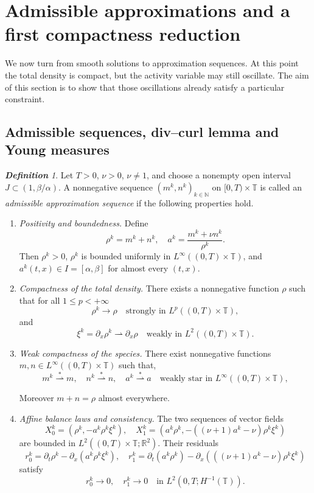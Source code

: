 \documentclass[a4paper,twosided,11pt]{article}
\newcommand{\R}{\mathbb{R}}
\newcommand{\N}{\mathbb{N}}
\newcommand{\T}{\mathbb{T}}
\newcommand{\al}{\alpha}
\newcommand{\be}{\beta}
\newcommand{\p}{\partial}
\newcommand{\1}{\mathbf{1}}
\theoremstyle{plain}
\theoremstyle{remark}
\newtheorem{definition}[thm]{\bf Definition}
\newcommand{\weakto}{\rightharpoonup}
\numberwithin{equation}{section}
\begin{document}
\section{Admissible approximations and a first compactness reduction}
\label{sec:young}

We now turn from smooth solutions to approximation sequences. At this point the total density is compact, but the activity variable may still oscillate. The aim of this section is to show that those oscillations already satisfy a particular constraint.

\subsection{Admissible sequences, div--curl lemma and Young measures}

\begin{definition}
\label{def:admissible}
Let $T>0$, $\nu>0$, $\nu\neq 1$, and choose a nonempty open interval $J\subset(1,\be/\al)$. A nonnegative sequence $(m^k,n^k)_{k\in\N}$ on $[0,T)\times\T$ is called an \emph{admissible approximation sequence} if the following properties hold.
\begin{enumerate}[label=(A\arabic*)]
\item \textit{Positivity and boundedness.}\label{A1}
Define
$$
 \rho^k=m^k+n^k,
 \quad
 a^k=\frac{m^k+\nu n^k}{\rho^k}.
$$
Then $\rho^k> 0$, $\rho^k$ is bounded uniformly in $L^\infty((0,T)\times\T)$, and $a^k(t,x)\in I=[\al,\be]$ for almost every $(t,x)$.

\item \textit{Compactness of the total density.}\label{A2}
There exists a nonnegative function $\rho$ such that for all $1\le p<+\infty$
$$
 \rho^k\to \rho \quad \text{strongly in } L^p((0,T)\times\T),
$$
and
$$
 \xi^k=\p_x\rho^k \weakto \p_x\rho \quad \text{weakly in } L^2((0,T)\times\T).
$$

\item \textit{Weak compactness of the species.}\label{A3}
There exist nonnegative functions $m,n\in L^\infty((0,T)\times\T)$ such that, 
$$
 m^k \overset{*}{\rightharpoonup} m,
 \quad
 n^k \overset{*}{\rightharpoonup} n, \quad a^k \overset{*}{\rightharpoonup} a
 \quad \text{weakly star in } L^\infty((0,T)\times\T),
$$

Moreover $m+n=\rho$ almost everywhere.

\item \textit{Affine balance laws and consistency.}\label{A4}
The two sequences of vector fields
$$
X_0^k=\left(\rho^k,-a^k\rho^k\xi^k\right),
\quad
X_1^k=\left(a^k\rho^k,-((\nu+1)a^k-\nu)\rho^k\xi^k\right)
$$
are bounded in $L^2((0,T)\times\T;\R^2)$. Their residuals
$$
r_0^k=\p_t\rho^k-\p_x(a^k\rho^k\xi^k),
\quad
r_1^k=\p_t(a^k\rho^k)-\p_x\left(((\nu+1)a^k-\nu)\rho^k\xi^k\right)
$$
satisfy
$$
r_0^k\to 0,
\quad
r_1^k\to 0
\quad \text{in } L^2(0,T;H^{-1}(\T)).
$$


\end{enumerate}
\end{definition}
\end{document}
